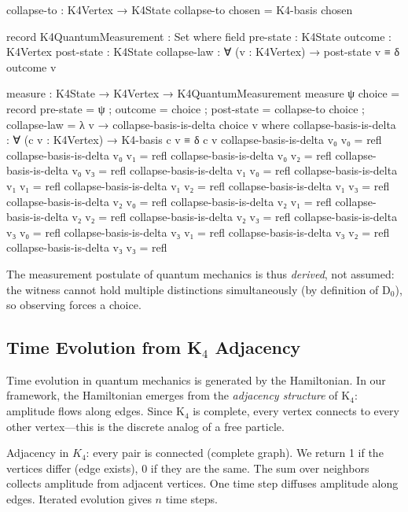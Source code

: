 \documentclass[11pt,a4paper]{book}
\begin{document}
\begin{code}
collapse-to : K4Vertex → K4State
collapse-to chosen = K4-basis chosen

record K4QuantumMeasurement : Set where
  field
    pre-state     : K4State
    outcome       : K4Vertex
    post-state    : K4State
    collapse-law  : ∀ (v : K4Vertex) → post-state v ≡ δ outcome v

measure : K4State → K4Vertex → K4QuantumMeasurement
measure ψ choice = record
  { pre-state    = ψ
  ; outcome      = choice
  ; post-state   = collapse-to choice
  ; collapse-law = λ v → collapse-basis-is-delta choice v
  }
  where
    collapse-basis-is-delta : ∀ (c v : K4Vertex) → K4-basis c v ≡ δ c v
    collapse-basis-is-delta v₀ v₀ = refl
    collapse-basis-is-delta v₀ v₁ = refl
    collapse-basis-is-delta v₀ v₂ = refl
    collapse-basis-is-delta v₀ v₃ = refl
    collapse-basis-is-delta v₁ v₀ = refl
    collapse-basis-is-delta v₁ v₁ = refl
    collapse-basis-is-delta v₁ v₂ = refl
    collapse-basis-is-delta v₁ v₃ = refl
    collapse-basis-is-delta v₂ v₀ = refl
    collapse-basis-is-delta v₂ v₁ = refl
    collapse-basis-is-delta v₂ v₂ = refl
    collapse-basis-is-delta v₂ v₃ = refl
    collapse-basis-is-delta v₃ v₀ = refl
    collapse-basis-is-delta v₃ v₁ = refl
    collapse-basis-is-delta v₃ v₂ = refl
    collapse-basis-is-delta v₃ v₃ = refl
\end{code}

The measurement postulate of quantum mechanics is thus \emph{derived}, not 
assumed: the witness cannot hold multiple distinctions simultaneously 
(by definition of D$_0$), so observing forces a choice.

\subsection[Time Evolution from K4 Adjacency]{Time Evolution from K$_4$ Adjacency}

Time evolution in quantum mechanics is generated by the Hamiltonian. In our
framework, the Hamiltonian emerges from the \emph{adjacency structure} of K$_4$:
amplitude flows along edges. Since K$_4$ is complete, every vertex connects
to every other vertex---this is the discrete analog of a free particle.

Adjacency in $K_4$: every pair is connected (complete graph). We return 1 if the vertices differ (edge exists), 0 if they are the same. The sum over neighbors collects amplitude from adjacent vertices. One time step diffuses amplitude along edges. Iterated evolution gives $n$ time steps.
\end{document}
